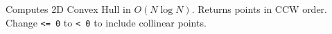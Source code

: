 
Computes 2D Convex Hull in $O(N \log N)$. Returns points in CCW order. Change \lstinline|<= 0| to \lstinline|< 0| to include collinear points.


